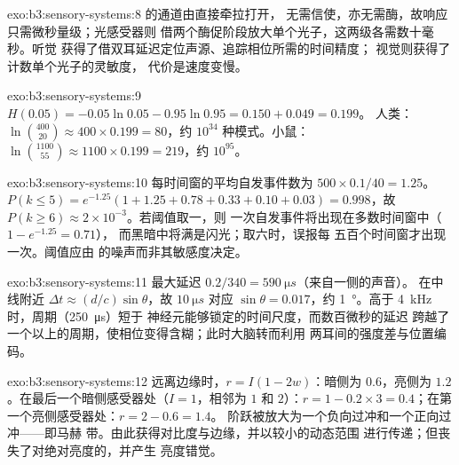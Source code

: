 \begin{solution}{exo:b3:sensory-systems:8}
的通道由直接牵拉打开，
无需信使，亦无需酶，故响应只需微秒量级；光感受器则
借两个酶促阶段放大单个光子，这两级各需数十毫秒。听觉
获得了借双耳延迟定位声源、追踪相位所需的时间精度；
视觉则获得了计数单个光子的灵敏度，
代价是速度变慢。
\end{solution}

\begin{solution}{exo:b3:sensory-systems:9}
$H(0.05) = -0.05\ln 0.05 - 0.95\ln 0.95 = 0.150 + 0.049 = 0.199$。
人类：$\ln\binom{400}{20} \approx 400\times 0.199 = 80$，约
$10^{34}$ 种模式。小鼠：$\ln\binom{1100}{55} \approx 1100\times 0.199
= 219$，约 $10^{95}$。
\end{solution}

\begin{solution}{exo:b3:sensory-systems:10}
每时间窗的平均自发事件数为 $500\times 0.1/40 = 1.25$。$P(k
\le 5) = e^{-1.25}(1 + 1.25 + 0.78 + 0.33 + 0.10 + 0.03) = 0.998$，故
$P(k \ge 6) \approx 2\times 10^{-3}$。若阈值取一，则
一次自发事件将出现在多数时间窗中（$1 - e^{-1.25} = 0.71$），
而黑暗中将满是闪光；取六时，误报每
五百个时间窗才出现一次。阈值应由
的噪声而非其敏感度决定。
\end{solution}

\begin{solution}{exo:b3:sensory-systems:11}
最大延迟 $0.2/340 = \qty{590}{\micro s}$（来自一侧的声音）。
在中线附近 $\Delta t \approx (d/c)\sin\theta$，故 $\qty{10}{\micro
s}$ 对应 $\sin\theta = 0.017$，约 \qty{1}{\degree}。高于
\qty{4}{kHz} 时，周期（\qty{250}{\micro s}）短于
神经元能够锁定的时间尺度，而数百微秒的延迟
跨越了一个以上的周期，使相位变得含糊；此时大脑转而利用
两耳间的强度差与位置编码。
\end{solution}

\begin{solution}{exo:b3:sensory-systems:12}
远离边缘时，$r = I(1 - 2w)$：暗侧为 $0.6$，亮侧为
$1.2$。在最后一个暗侧感受器处（$I = 1$，相邻为 $1$ 和 $2$）：$r
= 1 - 0.2\times 3 = 0.4$；在第一个亮侧感受器处：$r = 2 - 0.6 = 1.4$。
阶跃被放大为一个负向过冲和一个正向过冲——即马赫
带。由此获得对比度与边缘，并以较小的动态范围
进行传递；但丧失了对绝对亮度的，并产生
亮度错觉。
\end{solution}

